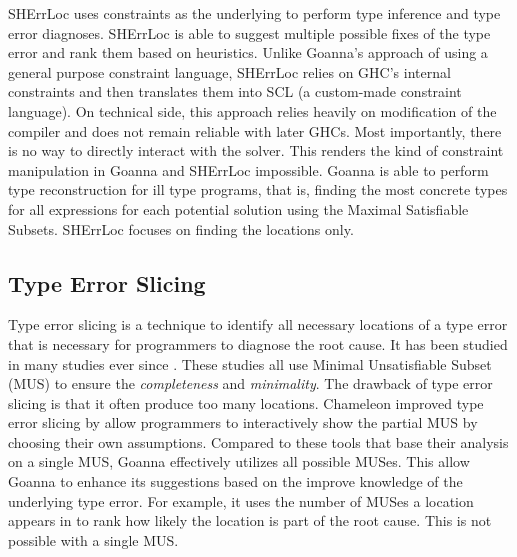    SHErrLoc \cite{Zhang2015-xy} uses constraints as the underlying to perform type inference and type error diagnoses. SHErrLoc is able to suggest multiple possible fixes of the type error and rank them based on heuristics. Unlike Goanna's approach of using a general purpose constraint language, SHErrLoc relies on GHC's internal constraints and then translates them into SCL (a custom-made constraint language). On technical side, this approach relies heavily on modification of the compiler and does not remain reliable with later GHCs. Most importantly, there is no way to directly interact with the solver. This renders the kind of constraint manipulation in Goanna and SHErrLoc impossible. Goanna is able to perform type reconstruction for ill type programs, that is, finding the most concrete types for all expressions for each potential solution using the Maximal Satisfiable Subsets. SHErrLoc focuses on finding the locations only.


\subsection{Type Error Slicing}

Type error slicing \cite{Haack2004-fr} is a technique to identify all necessary locations of a type error that is necessary for programmers to diagnose the root cause. It has been studied in many studies ever since \cite{Tip2001-qn, Heeren2003-kd}. These studies all use Minimal Unsatisfiable Subset (MUS) to ensure the \textit{completeness} and \textit{minimality}. The drawback of type error slicing is that it often produce too many locations.  Chameleon \cite{Stuckey2003-pz,Fu2021-xd} improved type error slicing by allow programmers to interactively show the partial MUS by choosing their own assumptions. Compared to these tools that base their analysis on a single MUS, Goanna effectively utilizes all possible MUSes. This allow Goanna to enhance its suggestions based on the improve knowledge of the underlying type error. For example, it uses the number of MUSes a location appears in to rank how likely the location is part of the root cause. This is not possible with a single MUS.  
%   

